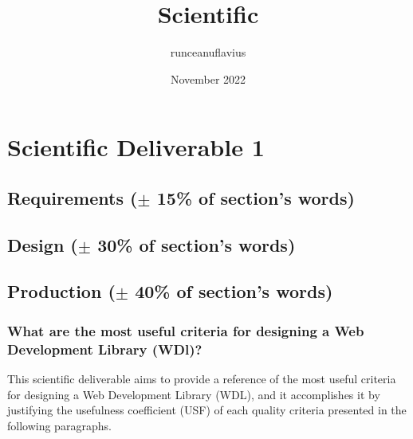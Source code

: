 \documentclass{article}
\title{Scientific}
\author{runceanuflavius}
\date{November 2022}
\begin{document}
\maketitle
\section{Scientific Deliverable 1}
\label{sec-production}
\subsection{Requirements ($\pm$ 15\% of section's words)}
\subsection{Design ($\pm$ 30\% of section's words)}
\subsection{Production ($\pm$ 40\% of section's words)}
\subsubsection{What are the most useful criteria for designing a Web Development Library (WDl)?}
This scientific deliverable aims to provide a reference of the most useful criteria for designing a Web Development Library (WDL), and it accomplishes it by justifying the usefulness coefficient (USF) of each quality criteria presented in the following paragraphs.  
\end{document}
